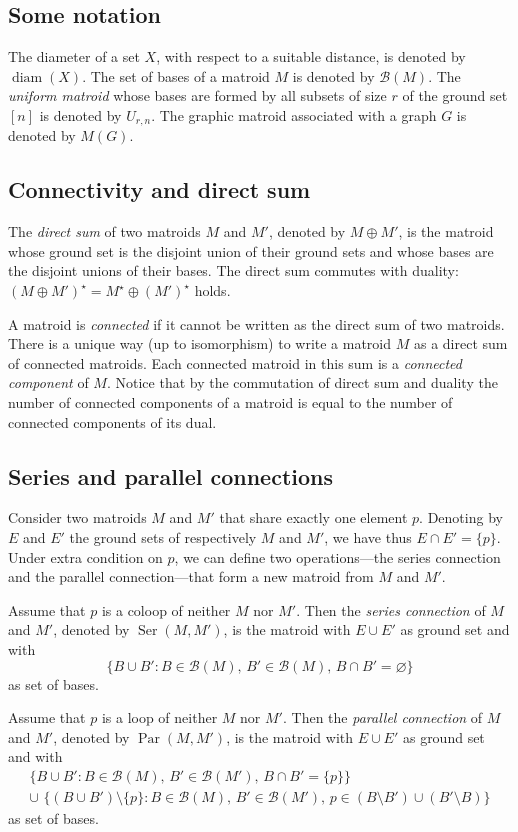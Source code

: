 \documentclass[12pt]{amsart}
\theoremstyle{plain}
\theoremstyle{definition}
\theoremstyle{remark}
\newcommand{\diame}{\mathsf{diam}}
\newcommand{\Ser}{\operatorname{Ser}}
\newcommand{\Par}{\operatorname{Par}}
\def \diame {\operatorname{diam}}
\def \B {\mathcal{B}}
\begin{document}
\subsection{Some notation}

The diameter of a set $X$, with respect to a suitable distance, is denoted by $\diame(X)$. The set of bases of a matroid $M$ is denoted by $\B(M)$. The {\em uniform matroid} whose bases are formed by all subsets of size $r$ of the ground set $[n]$ is denoted by $U_{r,n}$. The graphic matroid associated with a graph $G$ is denoted by $M(G)$.

\subsection{Connectivity and direct sum}
The {\em direct sum} of two matroids $M$ and $M'$, denoted by $M \oplus M'$, is the matroid whose ground set is the disjoint union of their ground sets and whose bases are the disjoint unions of their bases. The direct sum commutes with duality: $(M \oplus M')^\star = M^\star \oplus (M')^\star$ holds.

A matroid is {\em connected} if it cannot be written as the direct sum of two matroids. There is a unique way (up to isomorphism) to write a matroid $M$ as a direct sum of connected matroids. Each connected matroid in this sum is a {\em connected component} of $M$. Notice that by the commutation of direct sum and duality the number of connected components of a matroid is equal to the number of connected components of its dual.

\subsection{Series and parallel connections}
Consider two matroids $M$ and $M'$ that share exactly one element $p$. Denoting by $E$ and $E'$ the ground sets of respectively $M$ and $M'$, we have thus $E \cap E' = \{p\}$. Under extra condition on $p$, we can define two operations---the series connection and the parallel connection---that form a new matroid from $M$ and $M'$.

Assume that $p$ is a coloop of neither $M$ nor $M'$. Then the {\em series connection} of $M$ and $M'$, denoted by $\Ser(M,M')$, is the matroid with $E \cup E'$ as ground set and with \[
\bigl\{B \cup B' \colon B \in \B(M),\, B' \in \B(M), \, B \cap B' = \varnothing \bigl\}
\]as set of bases.

Assume that $p$ is a loop of neither $M$ nor $M'$. Then the {\em parallel connection} of $M$ and $M'$, denoted by $\Par(M,M')$, is the matroid with $E \cup E'$ as ground set and with 
\[
\begin{array}{l}
\bigl\{B \cup B' \colon B \in \B(M),\, B' \in \B(M'), \, B \cap B' = \{p\} \bigl\} \\[1.5ex] \cup \,\, \bigl\{(B \cup B') \setminus \{p\} \colon B \in \B(M),\, B' \in \B(M'), \, p \in (B \setminus B') \cup (B' \setminus B)\bigl\}
\end{array}
\] as set of bases.
\end{document}
